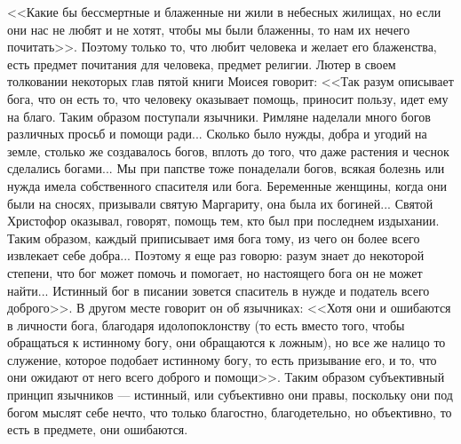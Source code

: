 \documentclass[12pt]{article}
\begin{document}
<<Какие бы бессмертные и блаженные ни жили в небесных жилищах, но если они нас не любят и не хотят, чтобы мы были блаженны, то нам их нечего почитать>>. Поэтому только то, что любит человека и желает его блаженства, есть предмет почитания для человека, предмет религии. Лютер в своем толковании некоторых глав пятой книги Моисея говорит: <<Так разум описывает бога, что он есть то, что человеку оказывает помощь, приносит пользу, идет ему на благо. Таким образом поступали язычники. Римляне наделали много богов различных просьб и помощи ради... Сколько было нужды, добра и угодий на земле, столько же создавалось богов, вплоть до того, что даже растения и чеснок сделались богами... Мы при папстве тоже понаделали богов, всякая болезнь или нужда имела собственного спасителя или бога. Беременные женщины, когда они были на сносях, призывали святую Маргариту, она была их богиней... Святой Христофор оказывал, говорят, помощь тем, кто был при последнем издыхании. Таким образом, каждый приписывает имя бога тому, из чего он более всего извлекает себе добра... Поэтому я еще раз говорю: разум знает до некоторой степени, что бог может помочь и помогает, но настоящего бога он не может найти... Истинный бог в писании зовется спаситель в нужде и податель всего доброго>>. В другом месте говорит он об язычниках: <<Хотя они и ошибаются в личности бога, благодаря идолопоклонству (то есть вместо того, чтобы обращаться к истинному богу, они обращаются к ложным), но все же налицо то служение, которое подобает истинному богу, то есть призывание его, и то, что они ожидают от него всего доброго и помощи>>. Таким образом субъективный принцип язычников --- истинный, или субъективно они правы, поскольку они под богом мыслят себе нечто, что только благостно, благодетельно, но объективно, то есть в предмете, они ошибаются. 
\end{document}
